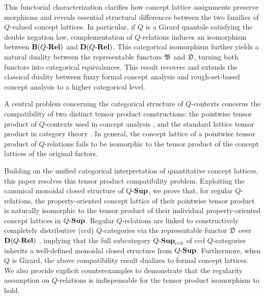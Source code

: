 \documentclass{tac}
\begin{document}
This functorial characterization clarifies how concept lattice assignments preserve morphisms and reveals essential structural differences between the two families of \(Q\)-valued concept lattices. In particular, if \(Q\) is a Girard quantale satisfying the double negation law, complementation of \(Q\)-relations induces an isomorphism between \({\mathbf{B}(Q\text{-}\mathbf{Rel})}\) and \({\mathbf{D}(Q\text{-}\mathbf{Rel})}\). This categorical isomorphism further yields a natural duality between the representable functors \(\mathfrak{B}\) and \(\mathfrak{D}\), turning both functors into categorical equivalences. This result recovers and extends the classical duality between fuzzy formal concept analysis and rough-set-based concept analysis \cite{LaiZhang2009,Yao2004} to a higher categorical level.

A central problem concerning the categorical structure of \(Q\)-contexts concerns the compatibility of two distinct tensor product constructions: the pointwise tensor product of \(Q\)-contexts used in concept analysis \cite{Erne1994, Ganter2024}, and the standard lattice tensor product in category theory \cite{Banaschewski1976, Garcia2017, JoyalTierney1984}. In general, the concept lattice of a pointwise tensor product of \(Q\)-relations fails to be isomorphic to the tensor product of the concept lattices of the original factors.

Building on the unified categorical interpretation of quantitative concept lattices, this paper resolves this tensor product compatibility problem. Exploiting the canonical monoidal closed structure of \({Q\text{-}\mathbf{Sup}}\), we prove that, for regular \(Q\)-relations, the property-oriented concept lattice of their pointwise tensor product is naturally isomorphic to the tensor product of their individual property-oriented concept lattices in \({Q\text{-}\mathbf{Sup}}\). Regular \(Q\)-relations are linked to constructively completely distributive (ccd) \(Q\)-categories via the representable functor $\mathfrak{D}$ over \({\mathbf{D}(Q\text{-}\mathbf{Rel})}\) \cite{LaiShen2018, Stubbe2007b}, implying that the full subcategory \({Q\text{-}\mathbf{Sup}}_{\mathrm{ccd}}\) of ccd \(Q\)-categories inherits a well-defined monoidal closed structure from \({Q\text{-}\mathbf{Sup}}\). Furthermore, when \(Q\) is Girard, the above compatibility result dualizes to formal concept lattices. We also provide explicit counterexamples to demonstrate that the regularity assumption on \(Q\)-relations is indispensable for the tensor product isomorphism to hold.
\end{document}
